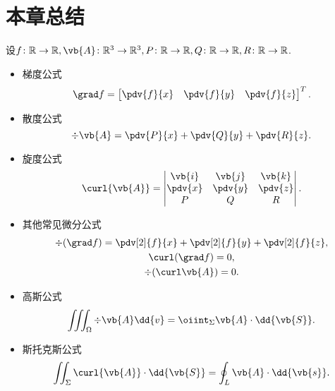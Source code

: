 \section{本章总结}
设\(f\colon\mathbb{R}\to\mathbb{R},
\vb{A}\colon\mathbb{R}^3\to\mathbb{R}^3,
P\colon\mathbb{R}\to\mathbb{R},
Q\colon\mathbb{R}\to\mathbb{R},
R\colon\mathbb{R}\to\mathbb{R}\).
\begin{itemize}
	\item 梯度公式\[
		\grad f
		= \begin{bmatrix}
			\pdv{f}{x} & \pdv{f}{y} & \pdv{f}{z}
		\end{bmatrix}^T.
	\]

	\item 散度公式\[
		\div{\vb{A}}
		= \pdv{P}{x}+\pdv{Q}{y}+\pdv{R}{z}.
	\]

	\item 旋度公式\[
		\curl{\vb{A}}
		= \begin{vmatrix}
			\vb{i} & \vb{j} & \vb{k} \\
			\pdv{x} & \pdv{y} & \pdv{z} \\
			P & Q & R
		\end{vmatrix}.
	\]

	\item 其他常见微分公式\begin{gather*}
		\div(\grad f)
		= \pdv[2]{f}{x} + \pdv[2]{f}{y} + \pdv[2]{f}{z}, \\
		\curl(\grad f)
		= 0, \\
		\div(\curl \vb{A})
		= 0.
	\end{gather*}

	\item 高斯公式\[
		\iiint_\Omega \div{\vb{A}} \dd{v}
		= \oiint_\Sigma \vb{A} \cdot \dd{\vb{S}}.
	\]

	\item 斯托克斯公式\[
		\iint_\Sigma \curl{\vb{A}} \cdot \dd{\vb{S}}
		= \oint_L \vb{A} \cdot \dd{\vb{s}}.
	\]
\end{itemize}

